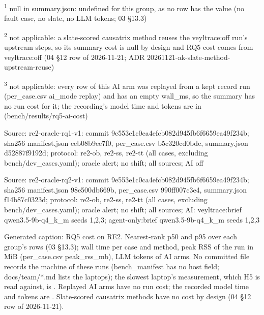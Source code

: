 \par\raggedright\noindent
\textsuperscript{1} null in summary.json: undefined for this group, as no row has the value (no fault case, no slate, no LLM tokens; 03 \S{}13.3)\par
\textsuperscript{2} not applicable: a slate-scored causatrix method reuses the veyltrace:off run's upstream steps, so its summary cost is null by design and RQ5 cost comes from veyltrace:off (04 \S{}12 row of 2026-11-21; ADR 20261121-ak-slate-method-upstream-reuse)\par
\textsuperscript{3} not applicable: every row of this AI arm was replayed from a kept record run (per\_case.csv ai\_mode replay) and has an empty wall\_ms, so the summary has no run cost for it; the recording's model time and tokens are in  (bench/\allowbreak{}results/\allowbreak{}rq5-ai-cost)\par
\noindent Source: re2-oracle-rq1-v1: commit 9e553e1c0ca4efcb082d945fb6f6659ea49f234b; sha256 manifest.json eeb08b9ee7f0, per\_case.csv b5c320cd0bde, summary.json d52887f9192d; protocol: re2-ob, re2-ss, re2-tt (all cases, excluding bench/\allowbreak{}dev\_cases.yaml); oracle alert; no shift; all sources; AI off\par
\noindent Source: re2-oracle-rq2-v1: commit 9e553e1c0ca4efcb082d945fb6f6659ea49f234b; sha256 manifest.json 98e500db669b, per\_case.csv 990ff007c3e4, summary.json f14b87c0323d; protocol: re2-ob, re2-ss, re2-tt (all cases, excluding bench/\allowbreak{}dev\_cases.yaml); oracle alert; no shift; all sources; AI: veyltrace:brief qwen3.5-9b-q4\_k\_m seeds 1,2,3; agent-only:brief qwen3.5-9b-q4\_k\_m seeds 1,2,3\par
\noindent Generated caption: RQ5 cost on RE2. Nearest-rank p50 and p95 over each group's rows (03 \S{}13.3); wall time per case and method, peak RSS of the run in MiB (per\_case.csv peak\_rss\_mb), LLM tokens of AI arms. No committed file records the machine of these runs (bench\_manifest has no host field; docs/\allowbreak{}team/\allowbreak{}*.md lists the laptops); the slowest laptop's measurement, which H5 is read against, is . Replayed AI arms have no run cost; the recorded model time and tokens are . Slate-scored causatrix methods have no cost by design (04 \S{}12 row of 2026-11-21).\par
\endgroup
